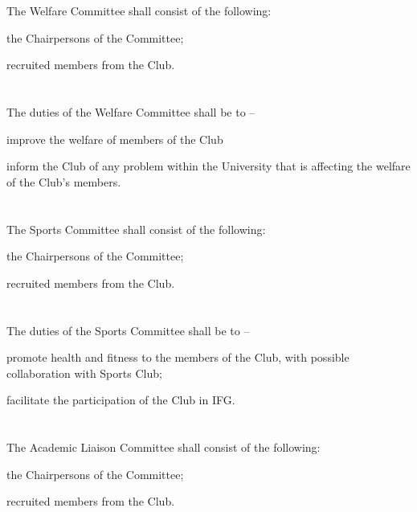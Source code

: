 \section{}
The Welfare Committee shall consist of the following:
	\begin{legal}
	\item the Chairpersons of the Committee;
	\item recruited members from the Club.
	\end{legal}

\section{}
The duties of the Welfare Committee shall be to –
	\begin{legal}
	\item improve the welfare of members of the Club
	\item inform the Club of any problem within the University that is affecting the welfare of the Club's members.
	\end{legal}

\section{}
The Sports Committee shall consist of the following:
	\begin{legal}
	\item the Chairpersons of the Committee;
	\item recruited members from the Club.
	\end{legal}

\section{}
The duties of the Sports Committee shall be to –
	\begin{legal}
	\item promote health and fitness to the members of the Club, with possible collaboration with Sports Club;
	\item facilitate the participation of the Club in IFG.
	\end{legal}

\section{}
The Academic Liaison Committee shall consist of the following:
	\begin{legal}
	\item the Chairpersons of the Committee;
	\item recruited members from the Club.
	\end{legal}

